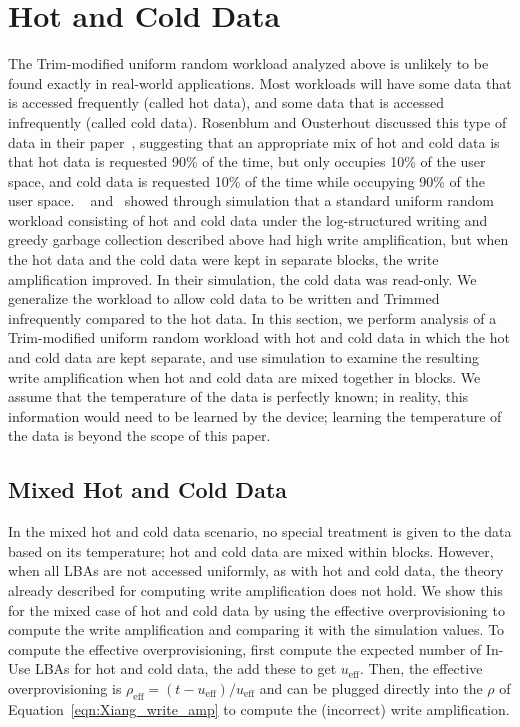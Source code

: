 \documentclass[prodmode,acmtos]{acmsmall}
\begin{document}
\section{Hot and Cold Data}
The Trim-modified uniform random workload analyzed above is unlikely to be found exactly in real-world applications.  Most workloads will have some data that is accessed frequently (called hot data), and some data that is accessed infrequently (called cold data).  Rosenblum and Ousterhout discussed this type of data in their paper~\cite{rosenblum1992design}, suggesting that an appropriate mix of hot and cold data is that hot data is requested 90\% of the time, but only occupies 10\% of the user space, and cold data is requested 10\% of the time while occupying 90\% of the user space.  ~ and~ showed through simulation that a standard uniform random workload consisting of hot and cold data under the log-structured writing and greedy garbage collection described above had high write amplification, but when the hot data and the cold data were kept in separate blocks, the write amplification improved.  In their simulation, the cold data was read-only.  We generalize the workload to allow cold data to be written and Trimmed infrequently compared to the hot data.  In this section, we perform analysis of a Trim-modified uniform random workload with hot and cold data in which the hot and cold data are kept separate, and use simulation to examine the resulting write amplification when hot and cold data are mixed together in blocks.  We assume that the temperature of the data is perfectly known; in reality, this information would need to be learned by the device; learning the temperature of the data is beyond the scope of this paper.


\subsection{Mixed Hot and Cold Data}
In the mixed hot and cold data scenario, no special treatment is given to the data based on its temperature; hot and cold data are mixed within blocks.  However, when all LBAs are not accessed uniformly, as with hot and cold data, the theory already described for computing write amplification does not hold.  We show this for the mixed case of hot and cold data by using the effective overprovisioning to compute the write amplification and comparing it with the simulation values.  To compute the effective overprovisioning, first compute the expected number of In-Use LBAs for hot and cold data, the add these to get $u_\text{eff}$.  Then, the effective overprovisioning is $\rho_\text{eff} = (t-u_\text{eff})/u_\text{eff}$ and can be plugged directly into the $\rho$ of Equation~\ref{eqn:Xiang_write_amp} to compute the (incorrect) write amplification.
\end{document}
